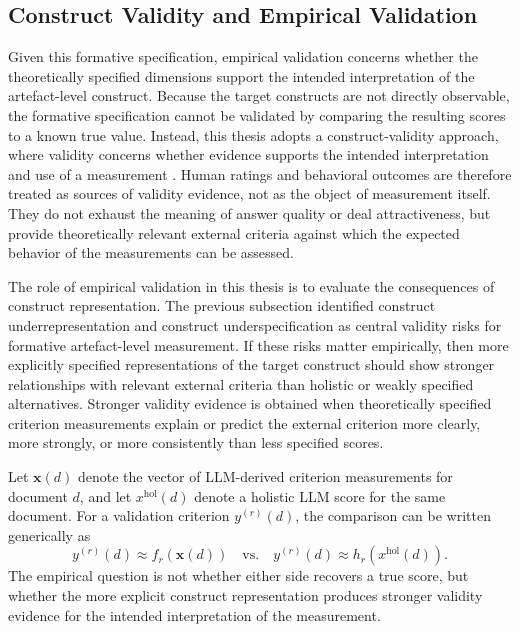 \subsection{Construct Validity and Empirical Validation}\label{sec:empirical_validation}


Given this formative specification, empirical validation concerns whether the theoretically specified dimensions support the intended interpretation of the artefact-level construct. Because the target constructs are not directly observable, the formative specification cannot be validated by comparing the resulting scores to a known true value. Instead, this thesis adopts a construct-validity approach, where validity concerns whether evidence supports the intended interpretation and use of a measurement \citep{messick1989meaning}. Human ratings and behavioral outcomes are therefore treated as sources of validity evidence, not as the object of measurement itself. They do not exhaust the meaning of answer quality or deal attractiveness, but provide theoretically relevant external criteria against which the expected behavior of the measurements can be assessed.

The role of empirical validation in this thesis is to evaluate the consequences of construct representation. The previous subsection identified construct underrepresentation and construct underspecification as central validity risks for formative artefact-level measurement. If these risks matter empirically, then more explicitly specified representations of the target construct should show stronger relationships with relevant external criteria than holistic or weakly specified alternatives. Stronger validity evidence is obtained when theoretically specified criterion measurements explain or predict the external criterion more clearly, more strongly, or more consistently than less specified scores.

Let $\mathbf{x}(d)$ denote the vector of LLM-derived criterion measurements for document $d$, and let $x^{\text{hol}}(d)$ denote a holistic LLM score for the same document. For a validation criterion $y^{(r)}(d)$, the comparison can be written generically as
\begin{equation}
    y^{(r)}(d) \approx f_r(\mathbf{x}(d))
    \quad \text{vs.} \quad
    y^{(r)}(d) \approx h_r(x^{\text{hol}}(d)).
\end{equation}
The empirical question is not whether either side recovers a true score, but whether the more explicit construct representation produces stronger validity evidence for the intended interpretation of the measurement.

